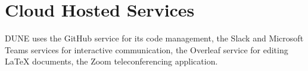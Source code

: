 \documentclass[../main-v1.tex]{subfiles}
\begin{document}

\section{Cloud Hosted Services}
DUNE uses the GitHub service for its code management, the Slack and Microsoft Teams services for interactive communication, the Overleaf service for editing \LaTeX{} documents, the Zoom teleconferencing application.
\end{document}

